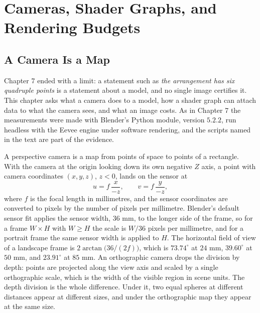\chapter{Cameras, Shader Graphs, and Rendering Budgets}

\section{A Camera Is a Map}

Chapter 7 ended with a limit: a statement such as \emph{the arrangement has six quadruple points} is a statement about a model, and no single image certifies it. This chapter asks what a camera does to a model, how a shader graph can attach data to what the camera sees, and what an image costs. As in Chapter 7 the measurements were made with Blender's Python module, version $5.2.2$, run headless with the Eevee engine under software rendering, and the scripts named in the text are part of the evidence.

A perspective camera is a map from points of space to points of a rectangle. With the camera at the origin looking down its own negative $Z$ axis, a point with camera coordinates $(x,y,z)$, $z<0$, lands on the sensor at
\[
  u = f\,\frac{x}{-z},\qquad v = f\,\frac{y}{-z},
\]
where $f$ is the focal length in millimetres, and the sensor coordinates are converted to pixels by the number of pixels per millimetre. Blender's default sensor fit applies the sensor width, $36$ mm, to the longer side of the frame, so for a frame $W\times H$ with $W\ge H$ the scale is $W/36$ pixels per millimetre, and for a portrait frame the same sensor width is applied to $H$. The horizontal field of view of a landscape frame is $2\arctan\bigl(36/(2f)\bigr)$, which is $73.74^\circ$ at $24$ mm, $39.60^\circ$ at $50$ mm, and $23.91^\circ$ at $85$ mm. An orthographic camera drops the division by depth: points are projected along the view axis and scaled by a single orthographic scale, which is the width of the visible region in scene units. The depth division is the whole difference. Under it, two equal spheres at different distances appear at different sizes, and under the orthographic map they appear at the same size.




